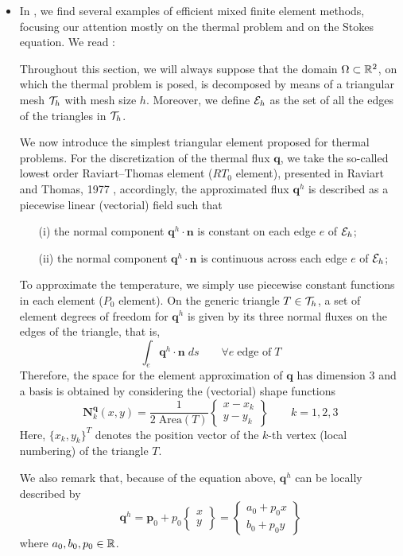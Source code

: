 \begin{itemize}
\item In \textcite{aubb17}, we find 
several examples of efficient mixed
finite element methods, focusing our attention mostly on the
thermal problem and on the Stokes equation. We read :
\begin{displayquote}
{\color{darkgray}
Throughout this section, we will always suppose that the
domain $\Omega \subset {\mathbb{R}}^2$, on which the thermal problem is posed, is
decomposed by means of a triangular mesh ${\cal T}_h$ with mesh
size $h$. Moreover, we define ${\cal E}_h$ as the set of all the edges of
the triangles in ${\cal T}_h$.

We now introduce the simplest
triangular element proposed for thermal problems.
For the discretization of the thermal flux ${\bm q}$, we take
the so-called lowest order Raviart–Thomas element
($RT_0$ element), presented in Raviart and Thomas, 1977 \cite{rath77},
accordingly, the approximated flux ${\bm q}^h$ is described as a
piecewise linear (vectorial) field such that
\begin{itemize}
\item[(i)] the normal component ${\bm q}^h\cdot {\bm n}$ is constant on each
edge $e$ of ${\cal E}_h$;
\item[(ii)] the normal component ${\bm q}^h\cdot {\bm n}$ is continuous across each
edge $e$ of ${\cal E}_h$;
\end{itemize}
To approximate the temperature, we simply use piecewise constant 
functions in each element ($P_0$ element).
On the generic triangle $T\in {\cal T}_h$, a set of element degrees
of freedom for ${\bm q}^h$ is given by its three normal fluxes on
the edges of the triangle, that is,
\[
\int_e {\bm q}^h \cdot {\bm n} \; ds \qquad \forall e\; \text{edge of}\; T
\]
Therefore, the space for the element approximation of ${\bm q}$
has dimension 3 and a basis is obtained by considering
the (vectorial) shape functions
\[
{\bm N}^{\bm q}_k(x,y) = \frac{1}{2  \; \text{Area}(T)} 
\left\{
\begin{array}{c}
x-x_k \\ y-y_k
\end{array}
\right\}
\qquad k=1,2,3
\]
Here, $\{x_k , y_k \}^T$ denotes the position vector of the $k$-th
vertex (local numbering) of the triangle $T$.

We also remark that, because of the equation above, ${\bm q}^h$ can be locally
described by
\[
{\bm q}^h = {\bm p}_0 + p_0 
\left\{
\begin{array}{c}
x \\y
\end{array}
\right\}
=
\left\{
\begin{array}{c}
a_0+p_0 x \\ b_0 + p_0 y
\end{array}
\right\}
\]
where $a_0,b_0,p_0 \in {\mathbb{R}}$.

}
\end{displayquote}
\end{itemize}
